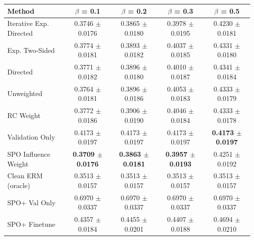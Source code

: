 \begin{tabular}{lcccc}
\toprule
Method & $\beta$ = 0.1 & $\beta$ = 0.2 & $\beta$ = 0.3 & $\beta$ = 0.5 \\
\midrule
Iterative Exp. Directed & 0.3746 $\pm$ 0.0176 & 0.3865 $\pm$ 0.0180 & 0.3978 $\pm$ 0.0195 & 0.4230 $\pm$ 0.0181 \\
Exp. Two-Sided & 0.3774 $\pm$ 0.0181 & 0.3893 $\pm$ 0.0182 & 0.4037 $\pm$ 0.0185 & 0.4331 $\pm$ 0.0180 \\
Directed & 0.3771 $\pm$ 0.0182 & 0.3896 $\pm$ 0.0180 & 0.4010 $\pm$ 0.0187 & 0.4341 $\pm$ 0.0184 \\
Unweighted & 0.3764 $\pm$ 0.0181 & 0.3896 $\pm$ 0.0186 & 0.4053 $\pm$ 0.0183 & 0.4333 $\pm$ 0.0179 \\
RC Weight & 0.3772 $\pm$ 0.0186 & 0.3906 $\pm$ 0.0190 & 0.4046 $\pm$ 0.0184 & 0.4333 $\pm$ 0.0178 \\
Validation Only & 0.4173 $\pm$ 0.0197 & 0.4173 $\pm$ 0.0197 & 0.4173 $\pm$ 0.0197 & \textbf{0.4173 $\pm$ 0.0197} \\
SPO Influence Weight & \textbf{0.3709 $\pm$ 0.0176} & \textbf{0.3863 $\pm$ 0.0181} & \textbf{0.3957 $\pm$ 0.0193} & 0.4251 $\pm$ 0.0192 \\
Clean ERM (oracle) & 0.3513 $\pm$ 0.0157 & 0.3513 $\pm$ 0.0157 & 0.3513 $\pm$ 0.0157 & 0.3513 $\pm$ 0.0157 \\
SPO+ Val Only & 0.6970 $\pm$ 0.0337 & 0.6970 $\pm$ 0.0337 & 0.6970 $\pm$ 0.0337 & 0.6970 $\pm$ 0.0337 \\
SPO+ Finetune & 0.4357 $\pm$ 0.0184 & 0.4455 $\pm$ 0.0201 & 0.4407 $\pm$ 0.0188 & 0.4694 $\pm$ 0.0210 \\
\bottomrule
\end{tabular}
